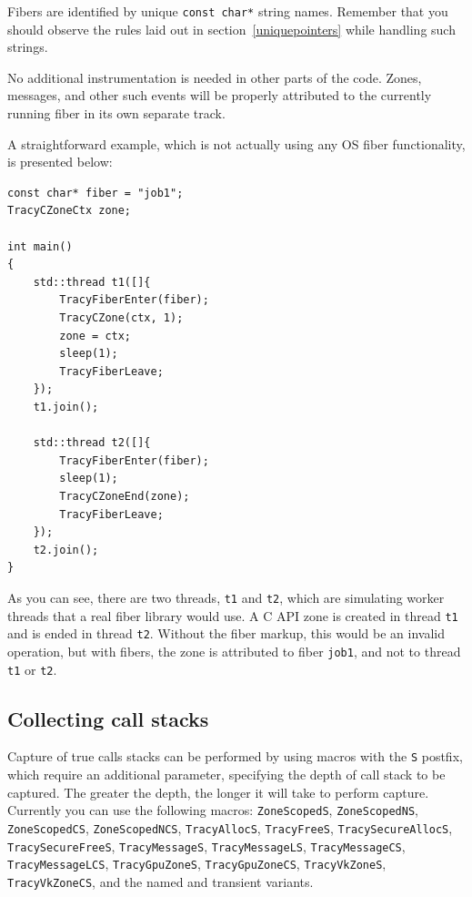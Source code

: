 \documentclass[hidelinks,titlepage,a4paper,twoside]{article}
\begin{document}
Fibers are identified by unique \texttt{const char*} string names. Remember that you should observe the rules laid out in section~\ref{uniquepointers} while handling such strings.

No additional instrumentation is needed in other parts of the code. Zones, messages, and other such events will be properly attributed to the currently running fiber in its own separate track.

A straightforward example, which is not actually using any OS fiber functionality, is presented below:

\begin{lstlisting}
const char* fiber = "job1";
TracyCZoneCtx zone;

int main()
{
    std::thread t1([]{
        TracyFiberEnter(fiber);
        TracyCZone(ctx, 1);
        zone = ctx;
        sleep(1);
        TracyFiberLeave;
    });
    t1.join();

    std::thread t2([]{
        TracyFiberEnter(fiber);
        sleep(1);
        TracyCZoneEnd(zone);
        TracyFiberLeave;
    });
    t2.join();
}
\end{lstlisting}

As you can see, there are two threads, \texttt{t1} and \texttt{t2}, which are simulating worker threads that a real fiber library would use. A C API zone is created in thread \texttt{t1} and is ended in thread \texttt{t2}. Without the fiber markup, this would be an invalid operation, but with fibers, the zone is attributed to fiber \texttt{job1}, and not to thread \texttt{t1} or \texttt{t2}.

\subsection{Collecting call stacks}
\label{collectingcallstacks}

Capture of true calls stacks can be performed by using macros with the \texttt{S} postfix, which require an additional parameter, specifying the depth of call stack to be captured. The greater the depth, the longer it will take to perform capture. Currently you can use the following macros: \texttt{ZoneScopedS}, \texttt{ZoneScopedNS}, \texttt{ZoneScopedCS}, \texttt{ZoneScopedNCS}, \texttt{TracyAllocS}, \texttt{TracyFreeS}, \texttt{TracySecureAllocS}, \texttt{TracySecureFreeS}, \texttt{TracyMessageS}, \texttt{TracyMessageLS}, \texttt{TracyMessageCS}, \texttt{TracyMessageLCS}, \texttt{TracyGpuZoneS}, \texttt{TracyGpuZoneCS}, \texttt{TracyVkZoneS}, \texttt{TracyVkZoneCS}, and the named and transient variants.
\end{document}
